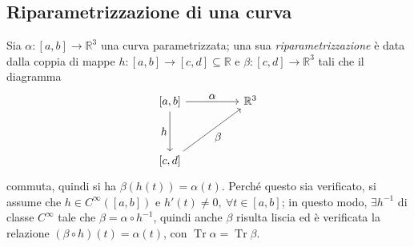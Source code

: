 \documentclass[12pt]{article}
\theoremstyle{style}
\numberwithin{equation}{subsection}
\begin{document}
\subsection{Riparametrizzazione di una curva}
Sia $\alpha : [a,b]\to\mathbb{R}^3$ una curva parametrizzata; una sua \textit{riparametrizzazione} \`e data dalla coppia di mappe $h:[a,b]\to [c,d] \subseteq \mathbb{R}$ e $\beta : [c,d]\to \mathbb{R}^3$ tali che il diagramma
\[
\begin{tikzcd}
	\left[ a,b \right]  & & \mathbb{R}^3\\
	\\
	\left[ c,d \right] 
	\arrow[from=1-1, to=1-3, "\displaystyle \alpha "]
	\arrow[from=1-1,to=3-1,"\displaystyle h"']
	\arrow[from=3-1,to=1-3,"\displaystyle \beta"']
\end{tikzcd}
\] 
commuta, quindi si ha $\beta (h(t)) = \alpha (t)$. 
Perch\'e questo sia verificato, si assume che $h \in C^\infty([a,b])$ e $h'(t) \neq 0, \ \forall t \in [a,b]$; in questo modo, $\exists h^{-1}$ di classe $C^\infty$ tale che $\beta = \alpha \circ h^{-1}$, quindi anche $\beta $ risulta liscia ed \`e verificata la relazione $(\beta \circ h)(t) = \alpha (t)$, con $\operatorname{Tr} \alpha =\operatorname{Tr} \beta $.
\end{document}

